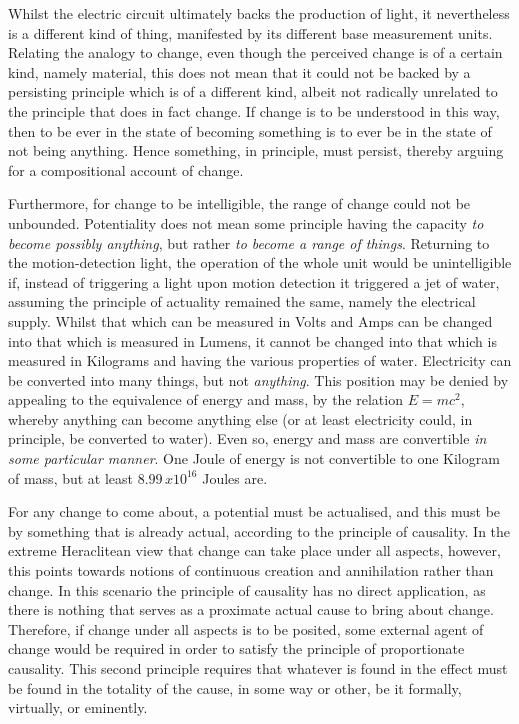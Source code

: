 Whilst the electric circuit ultimately backs the production of light, it nevertheless is a different kind of thing, manifested by its different base measurement units. Relating the analogy to change, even though the perceived change is of a certain kind, namely material, this does not mean that it could not be backed by a persisting principle which is of a different kind, albeit not radically unrelated to the principle that does in fact change. If change is to be understood in this way, then to be ever in the state of becoming something is to ever be in the state of not being anything. Hence something, in principle, must persist, thereby arguing for a compositional account of change.

Furthermore, for change to be intelligible, the range of change could not be unbounded. Potentiality does not mean some principle having the capacity \emph{to become possibly anything}, but rather \emph{to become a range of things}. Returning to the motion-detection light, the operation of the whole unit would be unintelligible if, instead of triggering a light upon motion detection it triggered a jet of water, assuming the principle of actuality remained the same, namely the electrical supply. Whilst that which can be measured in Volts and Amps can be changed into that which is measured in Lumens, it cannot be changed into that which is measured in Kilograms and having the various properties of water. Electricity can be converted into many things, but not \emph{anything}. This position may be denied by appealing to the equivalence of energy and mass, by the relation $E = mc^2$, whereby anything can become anything else (or at least electricity could, in principle, be converted to water). Even so, energy and mass are convertible \emph{in some particular manner}. One Joule of energy is not convertible to one Kilogram of mass, but at least $8.99\,x10^{16}$ Joules are.

For any change to come about, a potential must be actualised, and this must be by something that is already actual, according to the principle of causality. \parencite[][32]{feser2017five} In the extreme Heraclitean view that change can take place under all aspects, however, this points towards notions of continuous creation and annihilation rather than change.
In this scenario the principle of causality has no direct application, as there is nothing that serves as a proximate actual cause to bring about change. Therefore, if change under all aspects is to be posited, some external agent of change would be required in order to satisfy the principle of proportionate causality. This second principle requires that  whatever is found in the effect must be found in the totality of the cause, in some way or other, be it formally, virtually, or eminently.

